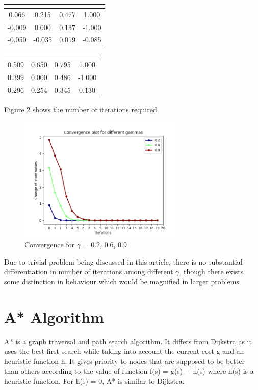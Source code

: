 \documentclass[10pt,a4paper,twocolumn]{article}
\begin{document}
		\begin{center}
		\begin{tabular}{ c c c c}
						 \hline
			\multicolumn{4}{|c|}{  \text{$\gamma = 0.6$} } \\
			\hline
			0.066 & 0.215 & 0.477 &1.000 \\
			-0.009 & 0.000 & 0.137 & -1.000 \\
			-0.050 & -0.035 & 0.019 & -0.085
		\end{tabular}
	\end{center}

	\begin{center}
	\begin{tabular}{ c c c c}
		\hline
		\multicolumn{4}{|c|}{  \text{$\gamma = 0.9$} } \\
		\hline
		0.509 & 0.650 & 0.795 &  1.000 \\
		0.399 & 0.000 & 0.486 & -1.000 \\
		0.296 & 0.254 & 0.345 & 0.130
	\end{tabular}
\end{center}

Figure 2 shows the number of iterations required

	\begin{figure}[ht!]
		\centering
		\includegraphics[width=80mm]{gammas}
		\caption{Convergence for $\gamma$ = 0.2, 0.6, 0.9 }
	\end{figure}

	
	Due to trivial problem being discussed in this article, there is no substantial differentiation in number of iterations among different $\gamma$, though there exists some distinction in behaviour which would be magnified in larger problems.

	\section{A* Algorithm}
	A* is a graph traversal and path search algorithm. It differs from Dijkstra as it uses the best first search while taking into account the current cost g and an heuristic function h. It gives priority to nodes that are supposed to be better than others according to the value of function f(s) = g(s) + h(s) where h(s) is a heuristic function. For h(s) = 0, A* is similar to Dijkstra.
	
\end{document}
